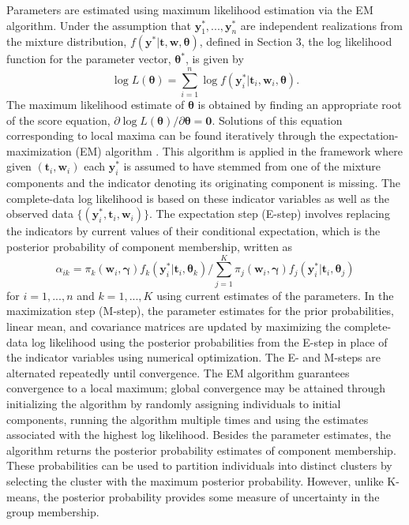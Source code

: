 \documentclass[12pt]{article}
\newcommand{\B}[0]{\mathbf}
\newcommand{\BS}[0]{\boldsymbol}
\begin{document}
Parameters are estimated using maximum likelihood estimation via the EM algorithm. Under the assumption that $\B y^{*}_{1},...,\B y^{*}_{n}$ are independent realizations from the mixture distribution, $f(\B y^{*} | \B t, \B w, \BS\theta)$, defined in Section 3, the log likelihood function for the parameter vector, $\BS \theta^{*}$, is given by
$$\log L(\BS\theta)=\sum^{n}_{i=1}\log f(\B y^{*}_{i}|\B t_{i},\B w_{i},\BS \theta).$$
The maximum likelihood estimate of $\BS\theta$ is obtained by finding an appropriate root of the score equation, $\partial \log L(\BS\theta)/\partial \BS\theta=\B 0.$ Solutions of this equation corresponding to local maxima can be found iteratively through the expectation-maximization (EM) algorithm \cite{dempster1977}. This algorithm is applied in the framework where given $(\B t_{i},\B w_{i})$ each $\B y^{*}_{i}$ is assumed to have stemmed from one of the mixture components and the indicator denoting its originating component is missing. The complete-data log likelihood is based on these indicator variables as well as the observed data $\{(\B y^{*}_{i}, \B t_{i}, \B w_{i})\}$. The expectation step (E-step) involves replacing the indicators by current values of their conditional expectation, which is the posterior probability of component membership, written as
$$\alpha_{ik}=\pi_{k}(\B w_{i},\BS\gamma)f_{k}(\B y^{*}_{i}|\B t_{i},\BS\theta_{k})/\sum_{j=1}^{K}\pi_{j}(\B w_{i},\BS\gamma)f_{j}(\B y^{*}_{i}|\B t_{i},\BS \theta_{j})$$
for $i=1,...,n$ and $k=1,...,K$ using current estimates of the parameters. In the maximization step (M-step), the parameter estimates for the prior probabilities, linear mean, and covariance matrices are updated by maximizing the complete-data log likelihood using the posterior probabilities from the E-step in place of the indicator variables using numerical optimization. The E- and M-steps are alternated repeatedly until convergence. The EM algorithm guarantees convergence to a local maximum; global convergence may be attained through initializing the algorithm by randomly assigning individuals to initial components, running the algorithm multiple times and using the estimates associated with the highest log likelihood. Besides the parameter estimates, the algorithm returns the posterior probability estimates of component membership. These probabilities can be used to partition individuals into distinct clusters by selecting the cluster with the maximum posterior probability. However, unlike K-means, the posterior probability provides some measure of uncertainty in the group membership. 
\end{document}

